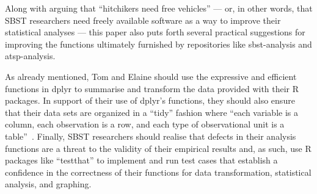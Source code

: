 



Along with arguing that ``hitchikers need free vehicles'' --- or, in other words, that SBST researchers need freely
available software as a way to improve their statistical analyses --- this paper also puts forth several practical
suggestions for improving the functions ultimately furnished by repositories like sbst-analysis and atsp-analysis.


As already mentioned, Tom and Elaine should use the expressive and efficient functions in dplyr to summarise and
transform the data provided with their R packages. In support of their use of dplyr's functions, they should also ensure
that their data sets are organized in a ``tidy'' fashion where ``each variable is a column, each observation is a row,
and each type of observational unit is a table''~\cite{Wickham2014}.  Finally, SBST researchers should realise that
defects in their analysis functions are a threat to the validity of their empirical results and, as such, use R packages
like ``testthat'' to implement and run test cases that establish a confidence in the correctness of their functions for
data transformation, statistical analysis, and graphing.


